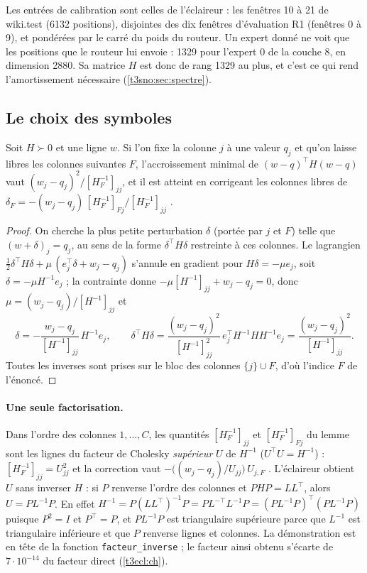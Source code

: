 Les entrées de calibration sont celles de l'éclaireur : les fenêtres 10 à 21 de wiki.test (\num{6132} positions), disjointes des dix fenêtres d'évaluation R1 (fenêtres 0 à 9), et pondérées par le carré du poids du routeur. Un expert donné ne voit que les positions que le routeur lui envoie : \num{1329} pour l'expert 0 de la couche 8, en dimension \num{2880}. Sa matrice $H$ est donc de rang \num{1329} au plus, et c'est ce qui rend l'amortissement nécessaire (\cref{t3sno:sec:spectre}).

\subsection{Le choix des symboles}\label{t3sno:sec:choix}

\begin{lemme}\label{t3sno:lem:obs}
Soit $H \succ 0$ et une ligne $w$. Si l'on fixe la colonne $j$ à une valeur $q_j$ et qu'on laisse libres les colonnes suivantes $F$, l'accroissement minimal de $(w - q)^\top H (w - q)$ vaut $(w_j - q_j)^2 / [H_F^{-1}]_{jj}$, et il est atteint en corrigeant les colonnes libres de $\delta_F = -(w_j - q_j)\,[H_F^{-1}]_{F j} / [H_F^{-1}]_{jj}$ \parencite{hassibi1992obs,frantar2022obc}.
\end{lemme}
\begin{proof}
On cherche la plus petite perturbation $\delta$ (portée par $j$ et $F$) telle que $(w + \delta)_j = q_j$, au sens de la forme $\delta^\top H \delta$ restreinte à ces colonnes. Le lagrangien $\tfrac12 \delta^\top H \delta + \mu\,(e_j^\top \delta + w_j - q_j)$ s'annule en gradient pour $H\delta = -\mu e_j$, soit $\delta = -\mu H^{-1} e_j$ ; la contrainte donne $-\mu [H^{-1}]_{jj} + w_j - q_j = 0$, donc $\mu = (w_j - q_j)/[H^{-1}]_{jj}$ et
\[
\delta = -\frac{w_j - q_j}{[H^{-1}]_{jj}}\, H^{-1} e_j,\qquad
\delta^\top H \delta = \frac{(w_j - q_j)^2}{[H^{-1}]_{jj}^2}\, e_j^\top H^{-1} H H^{-1} e_j = \frac{(w_j - q_j)^2}{[H^{-1}]_{jj}} .
\]
Toutes les inverses sont prises sur le bloc des colonnes $\{j\} \cup F$, d'où l'indice $F$ de l'énoncé.
\end{proof}

\paragraph{Une seule factorisation.} Dans l'ordre des colonnes $1, \dots, C$, les quantités $[H_F^{-1}]_{jj}$ et $[H_F^{-1}]_{Fj}$ du lemme sont les lignes du facteur de Cholesky \emph{supérieur} $U$ de $H^{-1}$ ($U^\top U = H^{-1}$) : $[H_F^{-1}]_{jj} = U_{jj}^2$ et la correction vaut $-\bigl((w_j - q_j)/U_{jj}\bigr)\, U_{j,F}$ \parencite{frantar2022gptq}. L'éclaireur obtient $U$ sans inverser $H$ : si $P$ renverse l'ordre des colonnes et $P H P = L L^\top$, alors $U = P L^{-1} P$. En effet $H^{-1} = P (L L^\top)^{-1} P = P L^{-\top} L^{-1} P = (P L^{-1} P)^\top (P L^{-1} P)$ puisque $P^2 = I$ et $P^\top = P$, et $P L^{-1} P$ est triangulaire supérieure parce que $L^{-1}$ est triangulaire inférieure et que $P$ renverse lignes et colonnes. La démonstration est en tête de la fonction \texttt{facteur\_inverse} ; le facteur ainsi obtenu s'écarte de $7 \cdot 10^{-14}$ du facteur direct (\cref{t3ecl:ch}).

